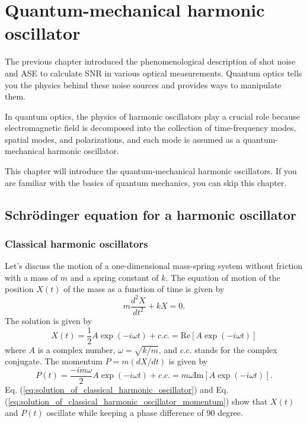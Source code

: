 \chapter{Quantum-mechanical harmonic oscillator}

The previous chapter introduced the phenomenological description of shot noise and ASE to calculate SNR in various optical measurements. Quantum optics tells you the physics behind these noise sources and provides ways to manipulate them.

In quantum optics, the physics of harmonic oscillators play a crucial role because electromagnetic field is decomposed into the collection of time-frequency modes, spatial modes, and polarizations, and each mode is assumed as a quantum-mechanical harmonic oscillator. 

This chapter will introduce the quantum-mechanical harmonic oscillators. If you are familiar with the basics of quantum mechanics, you can skip this chapter.

\section{Schr\"odinger equation for a harmonic oscillator}
\subsection{Classical harmonic oscillators}

Let's discuss the motion of a one-dimensional mass-spring system without friction with a mass of $m$ and a spring constant of $k$. The equation of motion of the position $X(t)$ of the mass as a function of time is given by
\begin{equation}
  m\frac{d^2X}{dt^2}+kX = 0.
\end{equation}
The solution is given by
\begin{equation}
  X(t) = \frac 1 2 A \exp (-i\omega t) + c.c. = \mathrm{Re}[A\exp(-i\omega t)]
 \label{eq:solution_of_classical_harmonic_oscillator}
\end{equation}
where $A$ is a complex number, $\omega = \sqrt{k/m}$, and $c.c.$ stands for the complex conjugate. The momentum $P = m (dX/dt)$ is given by
\begin{equation}
  P(t) = \frac {-im\omega}{2}A\exp(-i\omega t)+c.c. = m\omega\mathrm {Im}[A\exp(-i\omega t)].
  \label{eq:solution_of_classical_harmonic_oscillator_momentum}
\end{equation}
Eq. (\ref{eq:solution_of_classical_harmonic_oscillator}) and Eq. (\ref{eq:solution_of_classical_harmonic_oscillator_momentum}) show that $X(t)$ and $P(t)$ oscillate while keeping a phase difference of 90 degree.

